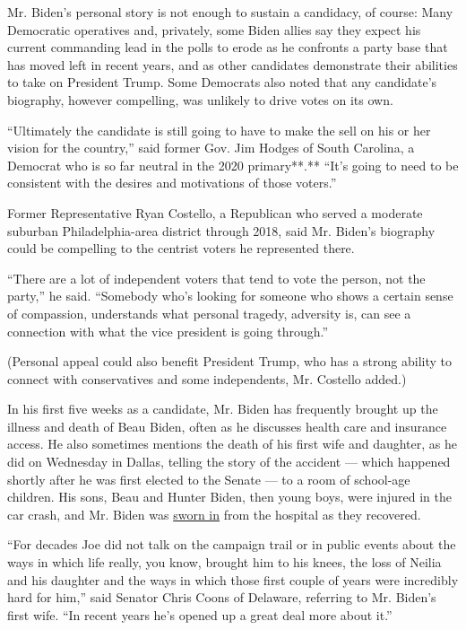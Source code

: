 Mr. Biden's personal story is not enough to sustain a candidacy, of
course: Many Democratic operatives and, privately, some Biden allies say
they expect his current commanding lead in the polls to erode as he
confronts a party base that has moved left in recent years, and as other
candidates demonstrate their abilities to take on President Trump. Some
Democrats also noted that any candidate's biography, however compelling,
was unlikely to drive votes on its own.

``Ultimately the candidate is still going to have to make the sell on
his or her vision for the country,'' said former Gov. Jim Hodges of
South Carolina, a Democrat who is so far neutral in the 2020
primary**.** ``It's going to need to be consistent with the desires and
motivations of those voters.''

Former Representative Ryan Costello, a Republican who served a moderate
suburban Philadelphia-area district through 2018, said Mr. Biden's
biography could be compelling to the centrist voters he represented
there.

``There are a lot of independent voters that tend to vote the person,
not the party,'' he said. ``Somebody who's looking for someone who shows
a certain sense of compassion, understands what personal tragedy,
adversity is, can see a connection with what the vice president is going
through.''

(Personal appeal could also benefit President Trump, who has a strong
ability to connect with conservatives and some independents, Mr.
Costello added.)

In his first five weeks as a candidate, Mr. Biden has frequently brought
up the illness and death of Beau Biden, often as he discusses health
care and insurance access. He also sometimes mentions the death of his
first wife and daughter, as he did on Wednesday in Dallas, telling the
story of the accident --- which happened shortly after he was first
elected to the Senate --- to a room of school-age children. His sons,
Beau and Hunter Biden, then young boys, were injured in the car crash,
and Mr. Biden was
\href{https://www.nytimes.com/1973/01/03/archives/biden-takes-oath-friday.html}{sworn
in} from the hospital as they recovered.

``For decades Joe did not talk on the campaign trail or in public events
about the ways in which life really, you know, brought him to his knees,
the loss of Neilia and his daughter and the ways in which those first
couple of years were incredibly hard for him,'' said Senator Chris Coons
of Delaware, referring to Mr. Biden's first wife. ``In recent years he's
opened up a great deal more about it.''

